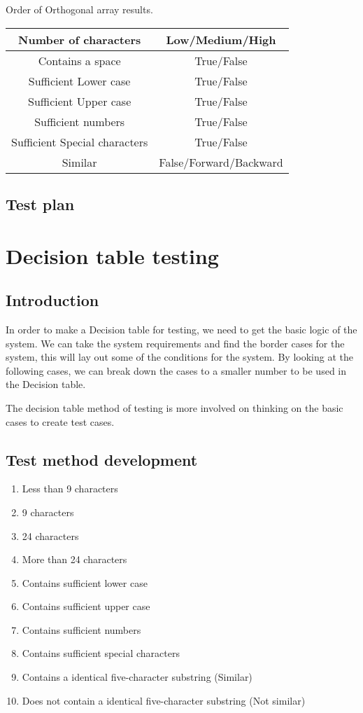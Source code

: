 \documentclass[12pt,letterpaper]{article}
\begin{document}
\centering Order of Orthogonal array results.
\begin{center}  
  \begin{tabular}{||c|c||}
  \hline
  Number of characters & Low/Medium/High \\
  \hline
  Contains a space & True/False \\
  \hline
  Sufficient Lower case & True/False \\
  \hline
  Sufficient Upper case& True/False \\
  \hline
  Sufficient numbers & True/False \\
  \hline
  Sufficient Special characters & True/False \\
  \hline
  Similar & False/Forward/Backward \\
  \hline
  \end{tabular}
\end{center}


\subsection{Test plan}


\section{Decision table testing}

\subsection{Introduction}

In order to make a Decision table for testing, we need to get the basic logic of the system.
We can take the system requirements and find the border cases for the system, this will lay
out some of the conditions for the system. By looking at the following cases, we
can break down the cases to a smaller number to be used in the Decision table.

The decision table method of testing is more involved on thinking on the basic cases to create
test cases.

\subsection{Test method development}

\begin{enumerate}
\item Less than 9 characters
\item 9 characters
\item 24 characters
\item More than 24 characters
\item Contains sufficient lower case
\item Contains sufficient upper case
\item Contains sufficient numbers
\item Contains sufficient special characters
\item Contains a identical five-character substring (Similar)
\item Does not contain a identical five-character substring (Not similar)
\end{enumerate}
\end{document}
